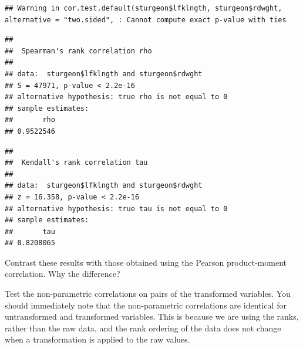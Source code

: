 \documentclass[
  12pt,
]{book}
\newenvironment{Shaded}{\begin{snugshade}}{\end{snugshade}}
\newcommand{\DataTypeTok}[1]{\textcolor[rgb]{0.13,0.29,0.53}{#1}}
\newcommand{\KeywordTok}[1]{\textcolor[rgb]{0.13,0.29,0.53}{\textbf{#1}}}
\newcommand{\NormalTok}[1]{#1}
\newcommand{\OperatorTok}[1]{\textcolor[rgb]{0.81,0.36,0.00}{\textbf{#1}}}
\newcommand{\StringTok}[1]{\textcolor[rgb]{0.31,0.60,0.02}{#1}}
\begin{document}
\begin{Shaded}
\end{Shaded}

\begin{verbatim}
## Warning in cor.test.default(sturgeon$lfklngth, sturgeon$rdwght, alternative = "two.sided", : Cannot compute exact p-value with ties
\end{verbatim}

\begin{verbatim}
## 
##  Spearman's rank correlation rho
## 
## data:  sturgeon$lfklngth and sturgeon$rdwght
## S = 47971, p-value < 2.2e-16
## alternative hypothesis: true rho is not equal to 0
## sample estimates:
##       rho 
## 0.9522546
\end{verbatim}

\begin{Shaded}
\end{Shaded}

\begin{verbatim}
## 
##  Kendall's rank correlation tau
## 
## data:  sturgeon$lfklngth and sturgeon$rdwght
## z = 16.358, p-value < 2.2e-16
## alternative hypothesis: true tau is not equal to 0
## sample estimates:
##       tau 
## 0.8208065
\end{verbatim}

Contrast these results with those obtained using the Pearson product-moment correlation. Why the difference?

Test the non-parametric correlations on pairs of the transformed variables. You should immediately note that the non-parametric correlations are identical for untransformed and transformed variables. This is because we are using the ranks, rather than the raw data, and the rank ordering of the data does not change when a transformation is applied to the raw values.
\end{document}
